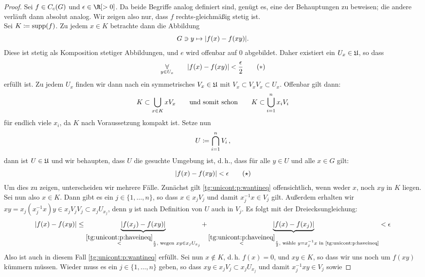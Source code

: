 \begin{proof}
    Sei $f\in C_c(G)$ und $\epsilon\in\R[>0]$.
    Da beide Begriffe analog definiert sind, genügt es, eine der Behauptungen zu
    beweisen; die andere verläuft dann absolut analog. Wir zeigen also nur, dass
    $f$ rechts-gleichmäßig stetig ist.
    \\
    Sei $K\coloneqq\operatorname{supp}(f)$. Zu jedem $x\in K$ betrachte dann die Abbildung
    \[ G\ni y \mapsto \lvert f(x)-f(xy) \rvert .\]
    Diese ist stetig als Komposition stetiger Abbildungen, und $e$ wird offenbar
    auf $0$ abgebildet. Daher existiert ein $U_x\in\mathfrak{U}$, so dass
    \[  \operatorname*{\forall}_{y\in U_x}\qquad
        \lvert f(x)-f(xy)\rvert < \frac{\epsilon}{2}
        \tag{$\ast$}\label{tg:unicont:p:haveineq}
    \]    
    erfüllt ist. Zu jedem $U_x$ finden wir dann nach 
    ein symmetrisches $V_x\in\mathfrak{U}$ mit $V_x \subset V_x V_x \subset U_x$.
    Offenbar gilt dann:
    \[  K \subset \bigcup_{x\in K} xV_x \qquad\text{und somit schon}\qquad
        K \subset \bigcup_{i=1}^n  x_iV_i 
    \]
    für endlich viele $x_i$, da $K$ nach Voraussetzung kompakt ist.
    Setze nun
    \[ U \coloneqq \bigcap_{i=1}^n V_i \,, \]
    dann ist $U\in\mathfrak{U}$ und wir behaupten, dass $U$ die gesuchte Umgebung ist,
    d.\,h., dass für alle $y\in U$ und alle $x\in G$ gilt: 
    \[ \lvert f(x) - f(xy) \rvert < \epsilon  
        \tag{$\star$}\label{tg:unicont:p:wantineq}
    \]
    Um dies zu zeigen, unterscheiden wir mehrere Fälle. Zunächst gilt
    \eqref{tg:unicont:p:wantineq} offensichtlich, wenn weder $x$, noch $xy$ in $K$
    liegen. Sei nun also $x\in K$. Dann gibt es ein $j\in\{1,\ldots,n\}$, so
    dass $x\in x_jV_j$ und damit $x_j^{-1}x \in V_j$ gilt. Außerdem erhalten
    wir $xy = x_j(x_j^{-1}x)y \in x_jV_jV_j \subset x_jU_{x_j}$, denn $y$ ist
    nach Definition von $U$ auch in $V_j$. Es folgt mit der Dreiecksungleichung:
    \[ \lvert f(x) - f(xy) \rvert 
        \leq \underbrace{ \lvert f(x_j) - f(xy)\rvert }_{
                \overset{\eqref{tg:unicont:p:haveineq}}{<} \frac{\epsilon}{2},
                \text{ wegen } xy\in x_jU_{x_j} 
             }
          +  \underbrace{ \lvert f(x) - f(x_j)\rvert }_{
                \overset{\eqref{tg:unicont:p:haveineq}}{<} \frac{\epsilon}{2},
                \text{ wähle } y=x_j^{-1}x \text{ in \eqref{tg:unicont:p:haveineq}}  
             }
        < \epsilon
    \]
    Also ist auch in diesem Fall \eqref{tg:unicont:p:wantineq} erfüllt.
    Sei nun $x\notin K$, d.\,h. $f(x)=0$, und $xy\in K$, so dass wir uns noch um
    $f(xy)$ kümmern müssen. Wieder muss es ein $j\in\{1,\ldots,n\}$ geben, so
    dass $xy\in x_jV_j\subset x_jU_{x_j}$ und damit $x_j^{-1}xy\in V_j$ sowie 

\end{proof}

